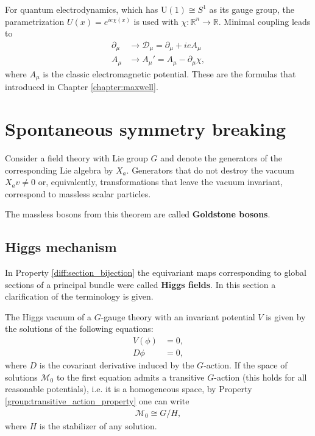     \begin{example}[QED]
        For quantum electrodynamics, which has $\mathrm{U}(1)\cong S^1$ as its gauge group, the parametrization $U(x) = e^{ie\chi(x)}$ is used with $\chi:\mathbb{R}^n\rightarrow\mathbb{R}$. Minimal coupling leads to
        \begin{align}
            \partial_\mu &\longrightarrow\mathcal{D}_\mu = \partial_\mu + ieA_\mu\\
            A_\mu &\longrightarrow A_\mu' = A_\mu - \partial_\mu\chi,
        \end{align}
        where $A_\mu$ is the classic electromagnetic potential. These are the formulas that introduced in Chapter \ref{chapter:maxwell}.
    \end{example}

\section{Spontaneous symmetry breaking}

    \begin{theorem}[Goldstone]
        Consider a field theory with Lie group $G$ and denote the generators of the corresponding Lie algebra by $X_a$. Generators that do not destroy the vacuum $X_av\neq0$ or, equivalently, transformations that leave the vacuum invariant, correspond to massless scalar particles.
    \end{theorem}
    The massless bosons from this theorem are called \textbf{Goldstone bosons}.

\subsection{Higgs mechanism}

    In Property \ref{diff:section_bijection} the equivariant maps corresponding to global sections of a principal bundle were called \textbf{Higgs fields}. In this section a clarification of the terminology is given.

    The Higgs vacuum of a $G$-gauge theory with an invariant potential $V$ is given by the solutions of the following equations:
    \begin{align}
        V(\phi) &= 0,\\
        D\phi &= 0,
    \end{align}
    where $D$ is the covariant derivative induced by the $G$-action. If the space of solutions $\mathcal{M}_0$ to the first equation admits a transitive $G$-action (this holds for all reasonable potentials), i.e. it is a homogeneous space, by Property \ref{group:transitive_action_property} one can write
    \begin{gather}
        \mathcal{M}_0\cong G/H,
    \end{gather}
    where $H$ is the stabilizer of any solution.

